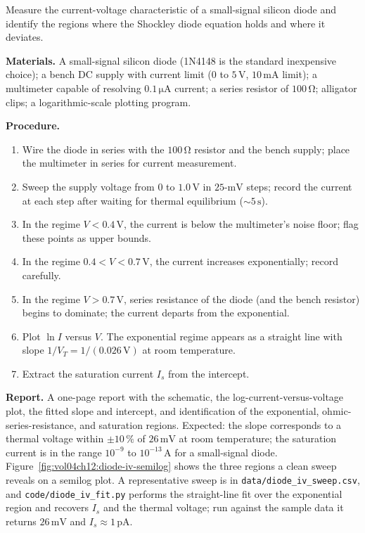 \begin{project}
Measure the current-voltage characteristic of a small-signal silicon
diode and identify the regions where the Shockley diode equation
holds and where it deviates.

\textbf{Materials.}
A small-signal silicon diode (1N4148 is the standard inexpensive
choice); a bench DC supply with current limit ($0$ to $5\,\si{\volt}$,
$10\,\si{\milli\ampere}$ limit); a multimeter capable of resolving
$0.1\,\si{\micro\ampere}$ current; a series resistor of $100\,\si{
\ohm}$; alligator clips; a logarithmic-scale plotting program.

\textbf{Procedure.}
\begin{enumerate}
  \item Wire the diode in series with the $100\,\si{\ohm}$ resistor
    and the bench supply; place the multimeter in series for current
    measurement.
  \item Sweep the supply voltage from $0$ to $1.0\,\si{\volt}$ in
    $25$-$\si{\milli\volt}$ steps; record the current at each step
    after waiting for thermal equilibrium ($\sim 5\,\si{\second}$).
  \item In the regime $V < 0.4\,\si{\volt}$, the current is below the
    multimeter's noise floor; flag these points as upper bounds.
  \item In the regime $0.4 < V < 0.7\,\si{\volt}$, the current
    increases exponentially; record carefully.
  \item In the regime $V > 0.7\,\si{\volt}$, series resistance of
    the diode (and the bench resistor) begins to dominate; the
    current departs from the exponential.
  \item Plot $\ln I$ versus $V$. The exponential regime appears as a
    straight line with slope $1/V_{T} = 1/(0.026\,\si{\volt})$ at
    room temperature.
  \item Extract the saturation current $I_{s}$ from the intercept.
\end{enumerate}

\textbf{Report.} A one-page report with the schematic, the
log-current-versus-voltage plot, the fitted slope and intercept, and
identification of the exponential, ohmic-series-resistance, and
saturation regions. Expected: the slope corresponds to a thermal
voltage within $\pm 10\,\%$ of $26\,\si{\milli\volt}$ at room
temperature; the saturation current is in the range $10^{-9}$ to
$10^{-13}\,\si{\ampere}$ for a small-signal diode.
Figure~\ref{fig:vol04ch12:diode-iv-semilog} shows the three regions a
clean sweep reveals on a semilog plot. A representative sweep is in
\texttt{data/diode\_iv\_sweep.csv}, and \texttt{code/diode\_iv\_fit.py}
performs the straight-line fit over the exponential region and recovers
$I_{s}$ and the thermal voltage; run against the sample data it returns
$26\,\si{\milli\volt}$ and $I_{s} \approx 1\,\si{\pico\ampere}$.


\end{project}

